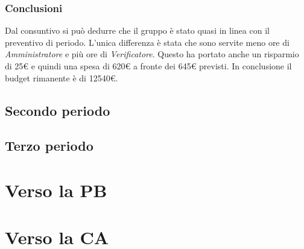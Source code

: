\subsubsection{Conclusioni}
Dal consuntivo si può dedurre che il gruppo è stato quasi in linea con il preventivo di periodo.
L'unica differenza è stata che sono servite meno ore di \textit{Amministratore} e più
ore di \textit{Verificatore}. Questo ha portato anche un risparmio di 25€ e quindi una spesa
di 620€ a fronte dei 645€ previsti.
In conclusione il budget rimanente è di 12540€.



\subsection{Secondo periodo}

\subsection{Terzo periodo}

\section{Verso la PB}

\section{Verso la CA}